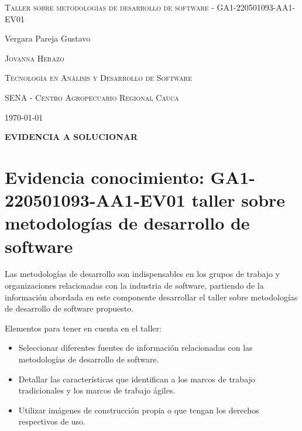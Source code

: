 \documentclass{article}
\author{Gustavo Vergara}
\theoremstyle{mytheoremstyle}
\theoremstyle{mytheoremstyle}
\theoremstyle{myproblemstyle}
\begin{document}
\pgfplotsset{compat=1.18}

\begin{titlepage}
    \centering
    \vspace{2.5cm}
    {\scshape \Large Taller sobre metodologías de desarrollo de software - GA1-220501093-AA1-EV01 \par}
    \vspace{5cm}
    \textbf\large\scshape{\par}
         \vspace{0.5cm}
         
    {\Large Vergara Pareja Gustavo\par}
    \vspace{5cm}
    {\scshape\Large Jovanna Herazo\par}
    \vspace{0.3cm}
    {\scshape\Large Tecnología en Análisis y Desarrollo de Software \par}
    \vspace{0.3cm}
    {\scshape\Large SENA - Centro Agropecuario Regional Cauca\par}
    \vspace{0.3cm}
    {\Large \today \par}
    \end{titlepage}

\begin{flushleft}
    \large \textbf{EVIDENCIA A SOLUCIONAR}\\
    \vspace{0.1cm}
    \section*{Evidencia conocimiento: GA1-220501093-AA1-EV01 taller sobre metodologías de desarrollo de software}
    Las metodologías de desarrollo son indispensables en los grupos de trabajo y organizaciones relacionadas con la industria de software, partiendo de la información abordada en este componente desarrollar el taller sobre metodologías de desarrollo de software propuesto.
    
Elementos para tener en cuenta en el taller:
\begin{itemize}
    \item Seleccionar diferentes fuentes de información relacionadas con las metodologías de desarrollo de software.
    \item Detallar las características que identifican a los marcos de trabajo tradicionales y los marcos de trabajo
    ágiles.
    \item Utilizar imágenes de construcción propia o que tengan los derechos respectivos de uso.
\end{itemize}   
    \end{flushleft}
    \newpage
    \tableofcontents
\end{document}
